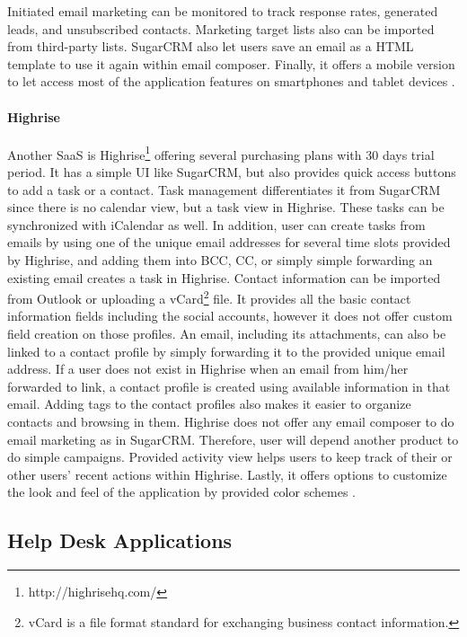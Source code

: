 Initiated email marketing can be monitored to track response rates, generated leads, and unsubscribed contacts. Marketing target lists also can be imported from third-party lists. SugarCRM also let users save an email as a \ac{HTML} template to use it again within email composer. Finally, it offers a mobile version to let access most of the application features on smartphones and tablet devices \citep{SugarCRMInc.2013}.

\paragraph{Highrise}
Another \ac{SaaS} is Highrise\footnote{http://highrisehq.com/} offering several purchasing plans with 30 days trial period. It has a simple \ac{UI} like SugarCRM, but also provides quick access buttons to add a task or a contact. Task management differentiates it from SugarCRM since there is no calendar view, but a task view in Highrise. These tasks can be synchronized with iCalendar as well. In addition, user can create tasks from emails by using one of the unique email addresses for several time slots provided by Highrise, and adding them into \ac{BCC}, \ac{CC}, or simply simple forwarding an existing email creates a task in Highrise. Contact information can be imported from Outlook or uploading a vCard\footnote{vCard is a file format standard for exchanging business contact information.} file. It provides all the basic contact information fields including the social accounts, however it does not offer custom field creation on those profiles. An email, including its attachments, can also be linked to a contact profile by simply forwarding it to the provided unique email address. If a user does not exist in Highrise when an email from him/her forwarded to link, a contact profile is created using available information in that email. Adding tags to the contact profiles also makes it easier to organize contacts and browsing in them. Highrise does not offer any email composer to do email marketing as in SugarCRM. Therefore, user will depend another product to do simple campaigns. Provided activity view helps users to keep track of their or other users' recent actions within Highrise. Lastly, it offers options to customize the look and feel of the application by provided color schemes \citep{37signals2013}.

\subsection{Help Desk Applications}
\label{subsec:3.3.2:HelpDeskAppl}

